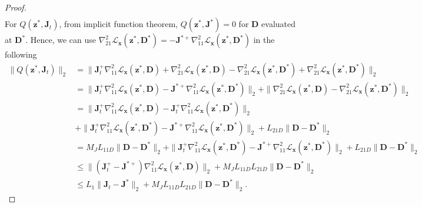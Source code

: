 \documentclass[10pt]{article} %
\newcommand{\D}{{\bm D}}
\newcommand{\J}{{\bm J}}
\newcommand{\x}{{\bm x}}
\newcommand{\z}{{\bm z}}
\newcommand{\Loss}{\mathcal{L}}
\begin{document}
\begin{proof}
\begin{equation}
\begin{aligned}
\end{aligned}
\end{equation}
%
For $Q(\z^{\ast}, \J_t)$, from implicit function theorem, $Q(\z^{\ast}, \J^{\ast}) = 0$ for $\D$ evaluated at $\D^{\ast}$. Hence, we can use $\nabla_{21}^2\Loss_{\x}(\z^{\ast}, \D^{\ast}) = - \J^{\ast+} \nabla_{11}^2\Loss_{\x}(\z^{\ast}, \D^{\ast})$ in the following
%
\begin{equation}
\begin{aligned}
\| Q(\z^{\ast}, \J_t) \|_2 &= \| \J_t^{+} \nabla_{11}^2\Loss_{\x}(\z^{\ast}, \D) + \nabla_{21}^2\Loss_{\x}(\z^{\ast}, \D) - \nabla_{21}^2\Loss_{\x}(\z^{\ast}, \D^{\ast}) + \nabla_{21}^2\Loss_{\x}(\z^{\ast}, \D^{\ast})\|_2\\
&= \| \J_t^{+} \nabla_{11}^2\Loss_{\x}(\z^{\ast}, \D) - \J^{\ast +} \nabla_{11}^2\Loss_{\x}(\z^{\ast}, \D^{\ast}) \|_2 + \| \nabla_{21}^2\Loss_{\x}(\z^{\ast}, \D) - \nabla_{21}^2\Loss_{\x}(\z^{\ast}, \D^{\ast})  \|_2\\
&= \| \J_t^{+} \nabla_{11}^2\Loss_{\x}(\z^{\ast}, \D) - \J_t^{+} \nabla_{11}^2\Loss_{\x}(\z^{\ast}, \D^{\ast}) \|_2\\
&+ \| \J_t^{+} \nabla_{11}^2\Loss_{\x}(\z^{\ast}, \D^{\ast}) - \J^{\ast+} \nabla_{11}^2\Loss_{\x}(\z^{\ast}, \D^{\ast}) \|_2 + L_{21D} \| \D - \D^{\ast}  \|_2\\
&= M_J L_{11D} \| \D - \D^{\ast}  \|_2 + \| \J_t^{+} \nabla_{11}^2\Loss_{\x}(\z^{\ast}, \D^{\ast}) - \J^{\ast+} \nabla_{11}^2\Loss_{\x}(\z^{\ast}, \D^{\ast}) \|_2 + L_{21D} \| \D - \D^{\ast} \|_2\\
&\leq \| (\J_t^{+} - \J^{\ast+}) \nabla_{11}^2\Loss_{\x}(\z^{\ast}, \D) \|_2 + M_J L_{11D} L_{21D} \| \D - \D^{\ast} \|_2\\
&\leq L_1 \| \J_t - \J^{\ast} \|_2 + M_J L_{11D} L_{21D} \| \D - \D^{\ast} \|_2.
\end{aligned}
\end{equation}
\end{proof}
%
\dictvariabledec*
%
\end{document}
